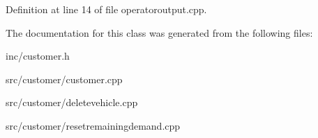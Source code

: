 Definition at line 14 of file operatoroutput.\+cpp.



The documentation for this class was generated from the following files\+:\begin{DoxyCompactItemize}
\item 
inc/customer.\+h\item 
src/customer/customer.\+cpp\item 
src/customer/deletevehicle.\+cpp\item 
src/customer/resetremainingdemand.\+cpp\end{DoxyCompactItemize}
